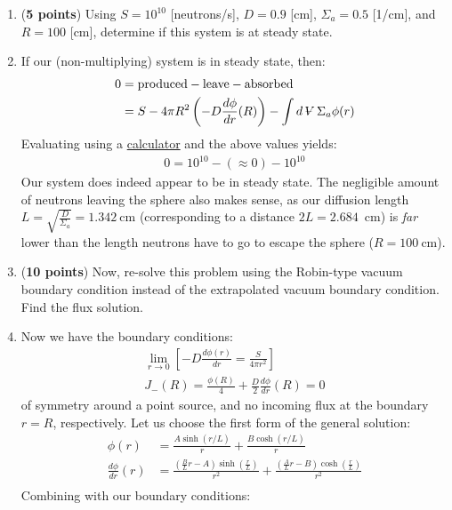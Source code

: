 \documentclass[11pt]{article}
\newcommand{\ans}[1]{{\color{violet}#1}}
\newcommand{\volume}{\mathop{\ooalign{\hfil$V$\hfil\cr\kern0.08em--\hfil\cr}}\nolimits} %
\begin{document}
\begin{enumerate}
{\begin{gather*}
    \end{gather*}
}
\item[(d)] ({\bf 5 points}) Using $S=10^{10}$ [neutrons/s], $D=0.9$ [cm], $\Sigma_a=0.5$ [1/cm], and $R=100$ [cm], determine if this system is at steady state. 
\item[] \ans{
    If our (non-multiplying) system is in steady state, then:
    \begin{align*}
        0&=\mathrm{produced-leave-absorbed}\\
        &=S-4\pi R^2\left(-D\frac{d\phi}{dr}(R)\right) - \int d\volume \Sigma_a\phi(r)
    \end{align*}
    Evaluating using a \href{https://www.desmos.com/calculator/omxnrigl9g}{calculator} and the above values yields:
    \begin{align*}
        0=10^{10}-(\approx0)-10^{10}
    \end{align*}
    Our system does indeed appear to be in steady state.
    The negligible amount of neutrons leaving the sphere also makes sense, as our diffusion length $L=\sqrt{\frac{D}{\Sigma_a}}=1.342~\mathrm{cm}$ (corresponding to a distance $2L=2.684$~cm) is \emph{far} lower than the length neutrons have to go to escape the sphere ($R=100~\mathrm{cm}$).
}
\item[(e)] ({\bf 10 points}) Now, re-solve this problem using the Robin-type vacuum boundary condition instead of the extrapolated vacuum boundary condition. Find the flux solution.
\item[] \ans{
    Now we have the boundary conditions:
    \begin{gather*}
        \lim_{r\rightarrow0}\left[-D\frac{d\phi(r)}{dr}=\frac{S}{4\pi r^2}\right]\\
        J_-(R)=\frac{\phi(R)}{4}+\frac{D}{2}\frac{d\phi}{dr}(R)=0
    \end{gather*}
    of symmetry around a point source, and no incoming flux at the boundary $r=R$, respectively.
    Let us choose the first form of the general solution:
    \begin{align*}
        \phi(r)&=\frac{A\sinh(r/L)}{r}+\frac{B\cosh(r/L)}{r}\\
        \frac{d\phi}{dr}(r)&=\frac{\left(\frac{B}{L}r-A\right)\sinh\left(\frac{r}{L}\right)}{r^{2}}+\frac{\left(\frac{A}{L}r-B\right)\cosh\left(\frac{r}{L}\right)}{r^{2}}\\
    \end{align*}
    Combining with our boundary conditions:
    \begin{gather*}

\end{gather*}}
\end{enumerate}
\end{document}
